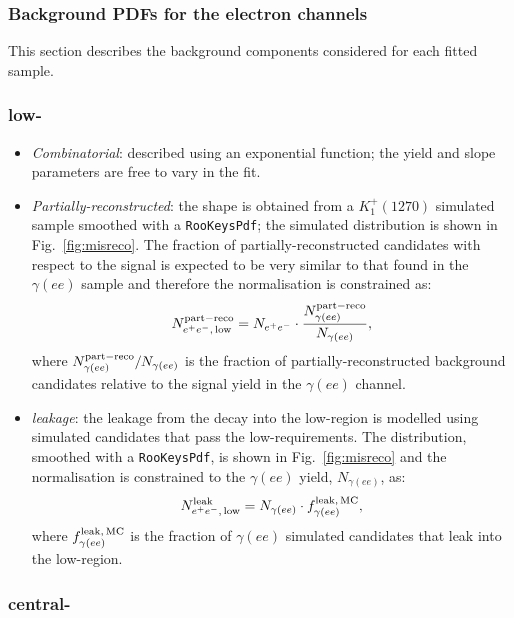 \subsubsection{Background PDFs for the electron channels}
\label{sec:RKst_misreco_fit}

This section describes the background components considered for each fitted sample.

\subsubsection*{\BdToKstee low-\qsq}

\begin{itemize}

\item \textit{Combinatorial}: described using an exponential function; the yield and slope parameters are free to vary in the fit.

\item \textit{Partially-reconstructed}: the shape is obtained from a $K_1^+(1270)$ simulated sample smoothed with
a \verb!RooKeysPdf!; the simulated distribution is shown in Fig.~\ref{fig:misreco}. The fraction of partially-reconstructed   
candidates with respect to the signal is expected to be very similar to that
found in the $\gamma(ee)$ sample and therefore the normalisation is constrained as:
%
$$N_{e^+ e^-, \, {\rm low}}^{\rm part-reco} = N_{e^+ e^-} \cdot \frac{N_{\gamma(ee)}^{\rm part-reco}}{N_{\gamma(ee)}},$$
%
where $N_{\gamma(ee)}^{\rm part-reco}/N_{\gamma(ee)}$ is the fraction of partially-reconstructed
 background candidates relative to the signal yield in the $\gamma(ee)$ channel.

\item \textit{\BdToKstG leakage}: the leakage from the \BdToKstGee decay into the low-\qsq region is modelled using simulated candidates that pass the low-\qsq requirements. The distribution, smoothed with a \verb!RooKeysPdf!, is shown in Fig.~\ref{fig:misreco} and the normalisation is constrained to the $\gamma(ee)$ yield, $N_{\gamma(ee)}$, as:
%
$$N_{e^+ e^-, \, {\rm low}}^{\rm leak} = N_{\gamma(ee)} \cdot f_{\gamma(ee)}^{\rm leak, \,MC},$$
%
where $f_{\gamma(ee)}^{\rm leak, \,MC}$ is the fraction of $\gamma(ee)$ simulated candidates that leak into the low-\qsq region.

\end{itemize}


\subsubsection*{\BdToKstee central-\qsq}

